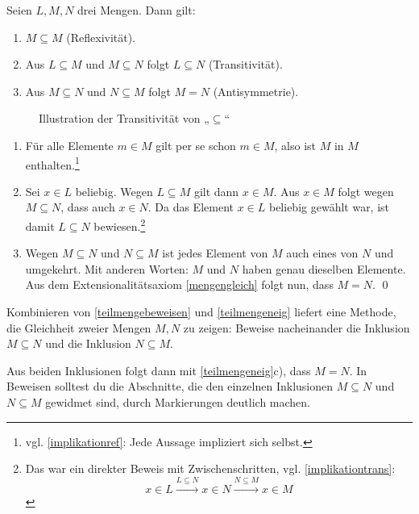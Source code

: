 \begin{satz}\label{teilmengeneig}
    Seien $L, M, N$ drei Mengen. Dann gilt:
    \begin{enumerate}
        \item $M\subseteq M$ (Reflexivität).
        \item Aus $L\subseteq M$ und $M\subseteq N$ folgt $L\subseteq N$ (Transitivität).
        \item Aus $M \subseteq N$ und $N\subseteq M$ folgt $M=N$ (Antisymmetrie).
    \end{enumerate}
    \begin{figure}[ht]
        \centering \caption{Illustration der Transitivität von „$\subseteq$“}
    \end{figure}
\end{satz}


\begin{bew}
    \begin{enumerate}
        \item Für alle Elemente $m\in M$ gilt per se schon $m\in M$, also ist $M$ in $M$ enthalten.\footnote{vgl. \cref{implikationref}: Jede Aussage impliziert sich selbst.}
        \item Sei $x\in L$ beliebig. Wegen $L\subseteq M$ gilt dann $x\in M$. Aus $x\in M$ folgt wegen $M\subseteq N$, dass auch $x\in N$. Da das Element $x\in L$ beliebig gewählt war, ist damit $L\subseteq N$ bewiesen.\footnote{Das war ein direkter Beweis mit Zwischenschritten, vgl. \cref{implikationtrans}:
            \[ x\in L\xrightarrow{L\subseteq N} x\in N \xrightarrow{N\subseteq M} x\in M \]}
        \item Wegen $M\subseteq N$ und $N\subseteq M$ ist jedes Element von $M$ auch eines von $N$ und umgekehrt. Mit anderen Worten: $M$ und $N$ haben genau dieselben Elemente. Aus dem Extensionalitätsaxiom \cref{mengengleich} folgt nun, dass $M=N$. \qed
    \end{enumerate}
\end{bew}


\begin{bem} \label{mengengleichbeweis}
    Kombinieren von \cref{teilmengebeweisen} und \cref{teilmengeneig} liefert eine Methode, die Gleichheit zweier Mengen $M,N$ zu zeigen: Beweise nacheinander die Inklusion $M\subseteq N$ und die Inklusion $N\subseteq M$.
    
    Aus beiden Inklusionen folgt dann mit \cref{teilmengeneig}c), dass $M=N$. In Beweisen solltest du die Abschnitte, die den einzelnen Inklusionen $M\subseteq N$ und $N\subseteq M$ gewidmet sind, durch Markierungen deutlich machen.
\end{bem}


